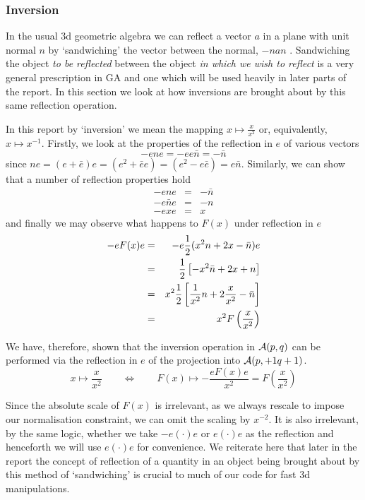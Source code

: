\subsubsection{Inversion}


In the usual 3d geometric algebra we can reflect a vector $a$ in a plane with
unit normal $n$ by `sandwiching' the vector between the normal, $-nan$
\cite{IJCV98}. Sandwiching the object \emph{to be reflected} between the object
\emph{in which we wish to reflect} is a very general prescription in GA and
one which will be used heavily in later parts of the report.  In this section
we look at how inversions are brought about by this same reflection operation.

In this report by `inversion' we mean the mapping $x \mapsto \frac{x}{x^2}$ or,
equivalently, $x \mapsto x^{-1}$. Firstly, we look at the properties of
the reflection in $e$ of various vectors
%
\[ -ene  = -ee\bar{n} = -\bar{n} \] 
since $ne = (e+\bar{e})e=(e^2+\bar{e}e)= (e^2 - e\bar{e}) = e\bar{n}$. 
Similarly, we can show that a number of reflection properties hold
%
\begin{eqnarray} -ene & = &  -\bar{n}  \\ -e\bar{n}e & = &  -{n}  \\ -exe & = &
x \end{eqnarray}
%
and finally we may observe what happens to $F(x)$ under reflection in $e$
%
\begin{eqnarray} -eF(x)e & = &  -e\frac{1}{2}(x^2n + 2x - \bar{n})e  \nonumber \\ & = &
\frac{1}{2}\left[-x^2\bar{n} + 2x + n\right] \nonumber \\ & = &  x^2\frac{1}{2}\left[
\frac{1}{x^2}n + 2\frac{x}{x^2} - \bar{n}\right] \nonumber \\ & = &  x^2
F\left(\frac{x}{x^2}\right) \end{eqnarray}
%

We have, therefore, shown that the inversion operation in ${\mathcal{A}}(p,q)$ can be
performed via the reflection in $e$ of the projection into ${\mathcal{A}}(p,+1q+1)$.
 \begin{equation} x \mapsto \frac{x}{x^2} \qquad \Leftrightarrow \qquad F(x) \mapsto
 -\frac{eF(x)e}{x^2} = F\left(\frac{x}{x^2}\right) \end{equation}
%

Since the absolute scale of $F(x)$ is irrelevant, as we always rescale to
impose our normalisation constraint, we can omit the scaling by $x^{-2}$.  It
is also irrelevant, by the same logic, whether we take $-e(\cdot)e$ or
$e(\cdot)e$ as the reflection and henceforth we will use $e(\cdot)e$ for
convenience. We reiterate here that later in the report the concept of
reflection of a quantity in an object being brought about by this method
of `sandwiching'
is crucial to much of our code for fast 3d
manipulations.

